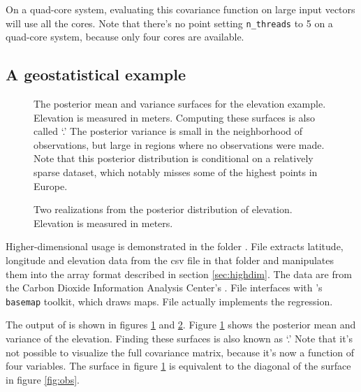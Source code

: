 \documentclass[]{manual}
\begin{document}
On a quad-core system, evaluating this covariance function on large input vectors will use all the cores. Note that there's no point setting \texttt{n_threads} to 5 on a quad-core system, because only four cores are available.

 
\subsection{A geostatistical example}\label{sub:geostat}
\begin{figure}
    \centering
    \caption{The posterior mean and variance surfaces for the elevation example. Elevation is measured in meters. Computing these surfaces is also called `.' The posterior variance is small in the neighborhood of observations, but large in regions where no observations were made. Note that this posterior distribution is conditional on a relatively sparse dataset, which notably misses some of the highest points in Europe.}
    \label{fig:elev}
\end{figure}
\begin{figure}
    \centering
    \caption{Two realizations from the posterior distribution of elevation. Elevation is measured in meters.}
    \label{fig:elevreal}
\end{figure}
Higher-dimensional usage is demonstrated in the folder . File  extracts latitude, longitude and elevation data from the csv file in that folder and manipulates them into the array format described in section \ref{sec:highdim}. The data are from the Carbon Dioxide Information Analysis Center's . File  interfaces with 's \texttt{basemap} toolkit, which draws maps. File  actually implements the regression.
%   

The output of  is shown in figures \ref{fig:elev} and \ref{fig:elevreal}. Figure \ref{fig:elev} shows the posterior mean and variance of the elevation. Finding these surfaces is also known as `.' Note that it's not possible to visualize the full covariance matrix, because it's now a function of four variables. The surface in figure \ref{fig:elev} is equivalent to the diagonal of the surface in figure \ref{fig:obs}.
\end{document}
